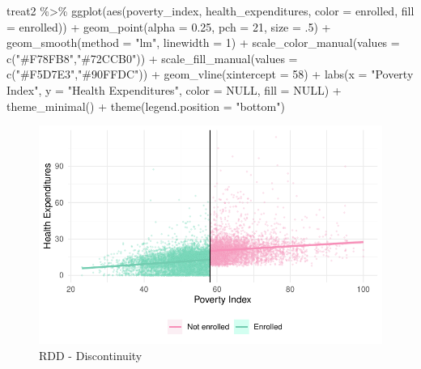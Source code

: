 \documentclass[
  letterpaper,
  DIV=11,
  numbers=noendperiod]{scrartcl}
\newenvironment{Shaded}{\begin{snugshade}}{\end{snugshade}}
\newcommand{\AttributeTok}[1]{\textcolor[rgb]{0.40,0.45,0.13}{#1}}
\newcommand{\ConstantTok}[1]{\textcolor[rgb]{0.56,0.35,0.01}{#1}}
\newcommand{\DecValTok}[1]{\textcolor[rgb]{0.68,0.00,0.00}{#1}}
\newcommand{\FloatTok}[1]{\textcolor[rgb]{0.68,0.00,0.00}{#1}}
\newcommand{\FunctionTok}[1]{\textcolor[rgb]{0.28,0.35,0.67}{#1}}
\newcommand{\NormalTok}[1]{\textcolor[rgb]{0.00,0.23,0.31}{#1}}
\newcommand{\SpecialCharTok}[1]{\textcolor[rgb]{0.37,0.37,0.37}{#1}}
\newcommand{\StringTok}[1]{\textcolor[rgb]{0.13,0.47,0.30}{#1}}
\begin{document}
\begin{Shaded}
\begin{Highlighting}[numbers=left,,]
\NormalTok{treat2 }\SpecialCharTok{\%\textgreater{}\%} 
  \FunctionTok{ggplot}\NormalTok{(}\FunctionTok{aes}\NormalTok{(poverty\_index, health\_expenditures, }\AttributeTok{color =}\NormalTok{ enrolled, }\AttributeTok{fill =}\NormalTok{ enrolled)) }\SpecialCharTok{+}
    \FunctionTok{geom\_point}\NormalTok{(}\AttributeTok{alpha =} \FloatTok{0.25}\NormalTok{, }\AttributeTok{pch =} \DecValTok{21}\NormalTok{, }\AttributeTok{size =}\NormalTok{ .}\DecValTok{5}\NormalTok{) }\SpecialCharTok{+}
    \FunctionTok{geom\_smooth}\NormalTok{(}\AttributeTok{method =} \StringTok{"lm"}\NormalTok{, }\AttributeTok{linewidth =} \DecValTok{1}\NormalTok{) }\SpecialCharTok{+}
    \FunctionTok{scale\_color\_manual}\NormalTok{(}\AttributeTok{values =} \FunctionTok{c}\NormalTok{(}\StringTok{"\#F78FB8"}\NormalTok{,}\StringTok{"\#72CCB0"}\NormalTok{)) }\SpecialCharTok{+}
    \FunctionTok{scale\_fill\_manual}\NormalTok{(}\AttributeTok{values =} \FunctionTok{c}\NormalTok{(}\StringTok{"\#F5D7E3"}\NormalTok{,}\StringTok{"\#90FFDC"}\NormalTok{)) }\SpecialCharTok{+}
    \FunctionTok{geom\_vline}\NormalTok{(}\AttributeTok{xintercept =} \DecValTok{58}\NormalTok{) }\SpecialCharTok{+}
    \FunctionTok{labs}\NormalTok{(}\AttributeTok{x =} \StringTok{"Poverty Index"}\NormalTok{,}
         \AttributeTok{y =} \StringTok{"Health Expenditures"}\NormalTok{,}
         \AttributeTok{color =} \ConstantTok{NULL}\NormalTok{,}
         \AttributeTok{fill =} \ConstantTok{NULL}\NormalTok{) }\SpecialCharTok{+}
    \FunctionTok{theme\_minimal}\NormalTok{() }\SpecialCharTok{+} 
    \FunctionTok{theme}\NormalTok{(}\AttributeTok{legend.position =} \StringTok{"bottom"}\NormalTok{)}
\end{Highlighting}
\end{Shaded}

\begin{figure}[H]

\caption{\label{fig-rdd3}RDD - Discontinuity}

{\centering \includegraphics{Jamie-Esmond_problem-set-8_files/figure-pdf/fig-rdd3-1.pdf}

}

\end{figure}
\end{document}
